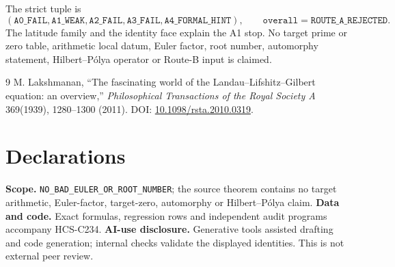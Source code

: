 \documentclass[10pt]{article}
\begin{document}
The strict tuple is
\[
(\mathtt{A0\_FAIL},\mathtt{A1\_WEAK},\mathtt{A2\_FAIL},\mathtt{A3\_FAIL},
 \mathtt{A4\_FORMAL\_HINT}),
\qquad \mathtt{overall=ROUTE\_A\_REJECTED}.
\]
The latitude family and the identity face explain the A1 stop.  No target
prime or zero table, arithmetic local datum, Euler factor, root number,
automorphy statement, Hilbert--Pólya operator or Route-B input is claimed.
\fi

\begin{thebibliography}{9}
M. Lakshmanan, ``The fascinating world of the Landau--Lifshitz--Gilbert
equation: an overview,'' \emph{Philosophical Transactions of the Royal
Society A} 369(1939), 1280--1300 (2011).
DOI: \href{https://doi.org/10.1098/rsta.2010.0319}{10.1098/rsta.2010.0319}.
\end{thebibliography}

\section*{Declarations}
\textbf{Scope.} \nolinkurl{NO_BAD_EULER_OR_ROOT_NUMBER}; the source theorem
contains no target arithmetic, Euler-factor, target-zero, automorphy or
Hilbert--Pólya claim.  \textbf{Data and code.} Exact formulas, regression
rows and independent audit programs accompany HCS-C234.  \textbf{AI-use
disclosure.} Generative tools assisted drafting and code generation; internal
checks validate the displayed identities.  This is not external peer review.
\end{document}
